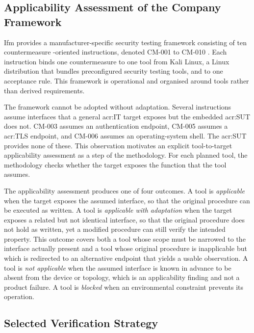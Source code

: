 \subsection{Applicability Assessment of the Company Framework} 
\label{subsec:company_framework} 

Ifm provides a manufacturer-specific security testing framework consisting of ten countermeasure -oriented instructions, denoted CM-001 to CM-010 \cite{ifm_security_testing_framework}. Each instruction binds one countermeasure to one tool from Kali Linux, a Linux distribution that bundles preconfigured security testing tools, and to one acceptance rule. This framework is operational and organised around tools rather than derived requirements. 

The framework cannot be adopted without adaptation. Several instructions assume interfaces that a general \gls{acr:IT} target exposes but the embedded \gls{acr:SUT} does not. CM-003 assumes an authentication endpoint, CM-005 assumes a \gls{acr:TLS} endpoint, and CM-006 assumes an operating-system shell. The \gls{acr:SUT} provides none of these. This observation motivates an explicit tool-to-target applicability assessment as a step of the methodology. For each planned tool, the methodology checks whether the target exposes the function that the tool assumes.

The applicability assessment produces one of four outcomes. A tool is \textit{applicable} when the target exposes the assumed interface, so that the original procedure can be executed as written. A tool is \textit{applicable with adaptation} when the target exposes a related but not identical interface, so that the original procedure does not hold as written, yet a modified procedure can still verify the intended property. This outcome covers both a tool whose scope must be narrowed to the interface actually present and a tool whose original procedure is inapplicable but which is redirected to an alternative endpoint that yields a usable observation. A tool is \textit{not applicable} when the assumed interface is known in advance to be absent from the device or topology, which is an applicability finding and not a product failure. A tool is \textit{blocked} when an environmental constraint prevents its operation. 


\subsection{Selected Verification Strategy} 
\label{subsec:selected_approach} 

